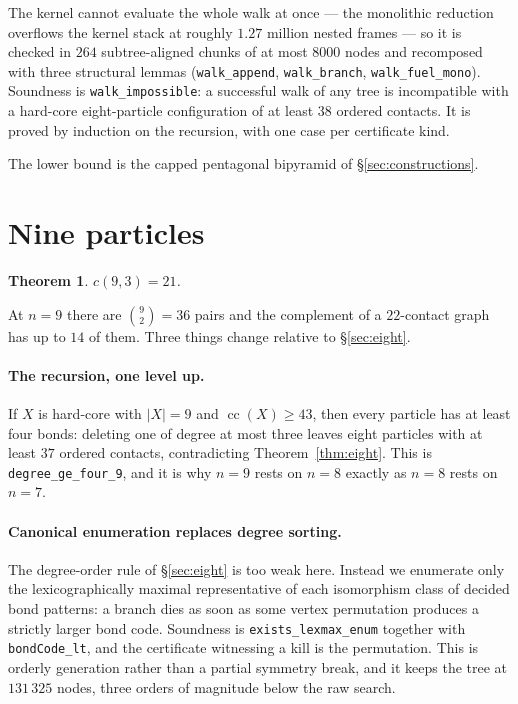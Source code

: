\documentclass[11pt,a4paper]{article}
\theoremstyle{plain}
\newtheorem{theorem}{Theorem}[section]
\theoremstyle{definition}
\newcommand{\card}[1]{\lvert #1 \rvert}
\begin{document}
The kernel cannot evaluate the whole walk at once --- the monolithic reduction
overflows the kernel stack at roughly $1.27$ million nested frames --- so it is checked
in $264$ subtree-aligned chunks of at most $8000$ nodes and recomposed with three
structural lemmas (\texttt{walk\_append}, \texttt{walk\_branch},
\texttt{walk\_fuel\_mono}). Soundness is \texttt{walk\_impossible}: a successful walk of
any tree is incompatible with a hard-core eight-particle configuration of at least $38$
ordered contacts. It is proved by induction on the recursion, with one case per
certificate kind.

The lower bound is the capped pentagonal bipyramid of \S\ref{sec:constructions}.

\section{Nine particles}
\label{sec:nine}

\begin{theorem}
\label{thm:nine}
$c(9,3) = 21$.
\end{theorem}

At $n=9$ there are $\binom92 = 36$ pairs and the complement of a $22$-contact graph has
up to $14$ of them. Three things change relative to \S\ref{sec:eight}.

\paragraph{The recursion, one level up.} If $X$ is hard-core with $\card X = 9$ and
$\operatorname{cc}(X) \ge 43$, then every particle has at least four bonds: deleting one
of degree at most three leaves eight particles with at least $37$ ordered contacts,
contradicting Theorem~\ref{thm:eight}. This is \texttt{degree\_ge\_four\_9}, and it is
why $n=9$ rests on $n=8$ exactly as $n=8$ rests on $n=7$.

\paragraph{Canonical enumeration replaces degree sorting.} The degree-order rule of
\S\ref{sec:eight} is too weak here. Instead we enumerate only the lexicographically
maximal representative of each isomorphism class of decided bond patterns: a branch dies
as soon as some vertex permutation produces a strictly larger bond code. Soundness is
\texttt{exists\_lexmax\_enum} together with \texttt{bondCode\_lt}, and the certificate
witnessing a kill is the permutation. This is orderly generation rather than a partial
symmetry break, and it keeps the tree at $131\,325$ nodes, three orders of magnitude
below the raw search.
\end{document}
